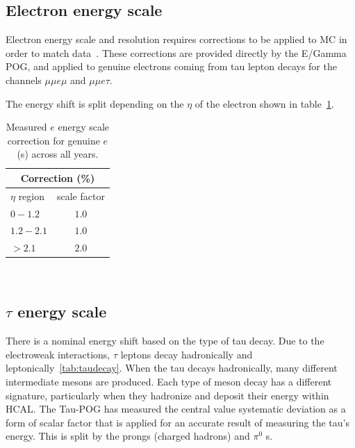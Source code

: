\subsection{Electron energy scale}

Electron energy scale and resolution requires corrections to be applied to MC in order to match data~\cite{EGammaEnergyScale}. These corrections are provided directly by the E/Gamma POG, and applied to genuine electrons coming from tau lepton decays for the channels $\mu\mu e \mu$ and $\mu\mu e \tau$.

The energy shift is split depending on the $\eta$ of the electron shown in table~\ref{tab:EES}.\\
\begin{table}[h]
  \begin{center}
    \label{tab:EES}
    \begin{tabular} { l | c }
      \hline \multicolumn{2}{c}{Correction (\%)} \\
      \hline $\eta$ region & scale factor  \\ \hline
      $0 - 1.2$ & $1.0$ \\ 
      $1.2 - 2.1 $& $1.0 $\\ 
      $> 2.1$ & $2.0$ \\ 
    \end{tabular}
    \caption{Measured $e$ energy scale correction for genuine $e$(s) across all years.}
  \end{center}
\end{table}\\

\subsection{$\tau$ energy scale}
There is a nominal energy shift based on the type of tau decay. Due to the electroweak interactions, $\tau$ leptons decay hadronically and leptonically~\ref{tab:taudecay}. When the tau decays hadronically, many different intermediate mesons are produced. Each type of meson decay has a different signature, particularly when they hadronize and deposit their energy within HCAL. The Tau-POG has measured the central value systematic deviation as a form of scalar factor that is applied for an accurate result of measuring the tau's energy. This is split by the prongs (charged hadrons) and $\pi^0$ s.  

